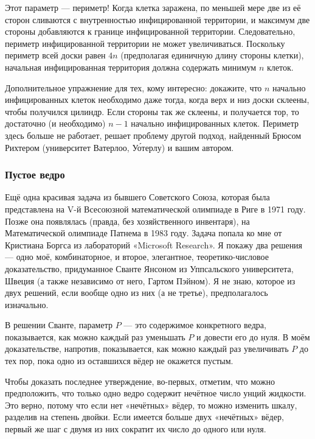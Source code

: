 Этот параметр --- периметр! Когда клетка заражена, по меньшей мере две из её сторон сливаются с внутренностью инфицированной территории, и максимум две стороны добавляются к границе инфицированной территории.
Следовательно, периметр инфицированной территории не может увеличиваться.
Поскольку периметр всей доски равен $4n$ (предполагая единичную длину стороны клетки), начальная инфицированная территория должна содержать минимум $n$ клеток.
\heart

Дополнительное упражнение для тех, кому интересно: докажите, что $n$ начально инфицированных клеток необходимо даже тогда, когда верх и низ доски склеены, чтобы получился цилиндр.
Если стороны так же склеены, и получается тор, то достаточно (и необходимо) $n-1$ начально инфицированных клеток.
Периметр здесь больше не работает,
решает проблему другой подход, найденный Брюсом Рихтером (университет Ватерлоо, Уо́терлу) %
и вашим автором.

\subsubsection*{Пустое ведро}%

Ещё одна красивая задача из бывшего Советского Союза, которая была представлена на V-й Всесоюзной математической олимпиаде в Риге в 1971 году.
Позже она появлялась (правда, без хозяйственного инвентаря), на Математической олимпиаде Патнема в 1983 году.
Задача попала ко мне от Кристиана Боргса из лабораторий «Microsoft Research». %
Я покажу два решения --- одно моё, комбинаторное, и второе, элегантное, теоретико-числовое доказательство, придуманное Сванте Янсоном из Уппсальского университета, Швеция %
(а также независимо от него, Гартом Пэйном). %
Я не знаю, которое из двух решений, если вообще одно из них (а не третье), предполагалось изначально.

\medskip

В решении Сванте, параметр $P$ --- это содержимое конкретного ведра, показывается, как можно каждый раз уменьшать $P$ и довести его до нуля.
В моём доказательстве, напротив, показывается, как можно каждый раз увеличивать $P$ до тех пор, пока одно из оставшихся вёдер не окажется пустым.

Чтобы доказать последнее утверждение, во-первых, отметим, что можно предположить, что только одно ведро содержит нечётное число унций жидкости.
Это верно, потому что если нет «нечётных» вёдер, то можно изменить шкалу, разделив на степень двойки.
Если имеется больше двух «нечётных» вёдер, первый же шаг с двумя из них сократит их число до одного или нуля.

